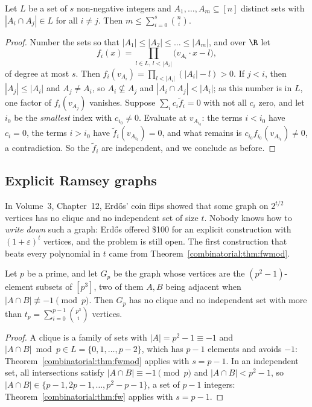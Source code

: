 \begin{theorem}\label{combinatorial:thm:fw}
Let $L$ be a set of $s$ non-negative integers and $A_1,\dots,A_m\subseteq[n]$ distinct sets with $|A_i\cap A_j|\in L$ for all $i\ne j$. Then $m\le\sum_{i=0}^s\binom ni$.
\end{theorem}
\begin{proof}
Number the sets so that $|A_1|\le|A_2|\le\dots\le|A_m|$, and over $\R$ let
\[
f_i(x)=\prod_{l\in L,\ l<|A_i|}\bigl(v_{A_i}\cdot x-l\bigr),
\]
of degree at most $s$. Then $f_i(v_{A_i})=\prod_{l<|A_i|}(|A_i|-l)>0$. If $j<i$, then $|A_j|\le|A_i|$ and $A_j\ne A_i$, so $A_i\not\subseteq A_j$ and $|A_i\cap A_j|<|A_i|$; as this number is in $L$, one factor of
$f_i(v_{A_j})$ vanishes. Suppose $\sum_ic_i\tilde f_i=0$ with not all $c_i$ zero, and let $i_0$ be the \emph{smallest} index with $c_{i_0}\ne0$. Evaluate at $v_{A_{i_0}}$: the terms $i<i_0$ have $c_i=0$, the terms $i>i_0$ have
$\tilde f_i(v_{A_{i_0}})=0$, and what remains is $c_{i_0}f_{i_0}(v_{A_{i_0}})\ne0$, a contradiction. So the $\tilde f_i$ are independent, and we conclude as before.
\end{proof}

\subsection*{Explicit Ramsey graphs}

In Volume~3, Chapter~12, Erd\H os' coin flips showed that some graph on $2^{t/2}$ vertices has no clique and no independent set of size $t$. Nobody knows how to \emph{write down} such a graph: Erd\H os offered
\$100 for an explicit construction with $(1+\varepsilon)^t$ vertices, and the problem is still open. The first construction that beats every polynomial in $t$ came from Theorem~\ref{combinatorial:thm:fwmod}.

\begin{theorem}\label{combinatorial:thm:explicitramsey}
Let $p$ be a prime, and let $G_p$ be the graph whose vertices are the $(p^2-1)$-element subsets of $[p^3]$, two of them $A,B$ being adjacent when $|A\cap B|\not\equiv-1\pmod p$. Then $G_p$ has no clique and no
independent set with more than $t_p=\sum_{i=0}^{p-1}\binom{p^3}i$ vertices.
\end{theorem}
\begin{proof}
A clique is a family of sets with $|A|=p^2-1\equiv-1$ and $|A\cap B|\bmod p\in L=\{0,1,\dots,p-2\}$, which has $p-1$ elements and avoids $-1$: Theorem~\ref{combinatorial:thm:fwmod} applies with $s=p-1$. In an independent set, all
intersections satisfy $|A\cap B|\equiv-1\pmod p$ and $|A\cap B|<p^2-1$, so $|A\cap B|\in\{p-1,2p-1,\dots,p^2-p-1\}$, a set of $p-1$ integers: Theorem~\ref{combinatorial:thm:fw} applies with $s=p-1$.
\end{proof}

